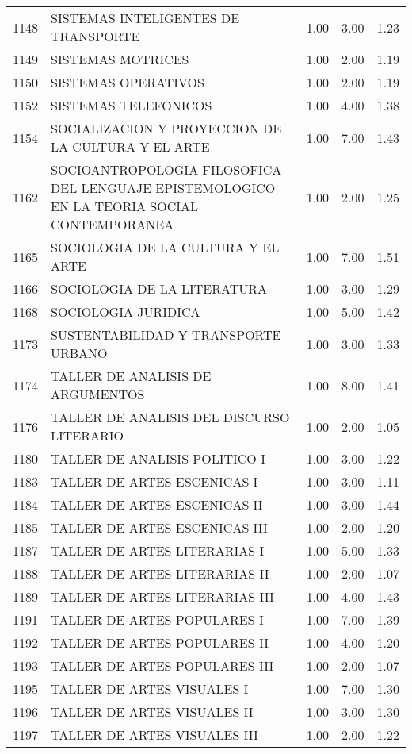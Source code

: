 \documentclass[12pt]{article}
\begin{document}
\begin{table}[ht]
\begin{tabular}{rlrrr}
  1148 & SISTEMAS INTELIGENTES DE TRANSPORTE & 1.00 & 3.00 & 1.23 \\ 
  1149 & SISTEMAS MOTRICES & 1.00 & 2.00 & 1.19 \\ 
  1150 & SISTEMAS OPERATIVOS & 1.00 & 2.00 & 1.19 \\ 
  1152 & SISTEMAS TELEFONICOS & 1.00 & 4.00 & 1.38 \\ 
  1154 & SOCIALIZACION Y PROYECCION DE LA CULTURA Y EL ARTE & 1.00 & 7.00 & 1.43 \\ 
  1162 & SOCIOANTROPOLOGIA FILOSOFICA DEL LENGUAJE EPISTEMOLOGICO EN LA TEORIA SOCIAL CONTEMPORANEA & 1.00 & 2.00 & 1.25 \\ 
  1165 & SOCIOLOGIA DE LA CULTURA Y EL ARTE & 1.00 & 7.00 & 1.51 \\ 
  1166 & SOCIOLOGIA DE LA LITERATURA & 1.00 & 3.00 & 1.29 \\ 
  1168 & SOCIOLOGIA JURIDICA & 1.00 & 5.00 & 1.42 \\ 
  1173 & SUSTENTABILIDAD Y TRANSPORTE URBANO & 1.00 & 3.00 & 1.33 \\ 
  1174 & TALLER DE ANALISIS DE ARGUMENTOS & 1.00 & 8.00 & 1.41 \\ 
  1176 & TALLER DE ANALISIS DEL DISCURSO LITERARIO & 1.00 & 2.00 & 1.05 \\ 
  1180 & TALLER DE ANALISIS POLITICO I & 1.00 & 3.00 & 1.22 \\ 
  1183 & TALLER DE ARTES ESCENICAS I & 1.00 & 3.00 & 1.11 \\ 
  1184 & TALLER DE ARTES ESCENICAS II & 1.00 & 3.00 & 1.44 \\ 
  1185 & TALLER DE ARTES ESCENICAS III & 1.00 & 2.00 & 1.20 \\ 
  1187 & TALLER DE ARTES LITERARIAS I & 1.00 & 5.00 & 1.33 \\ 
  1188 & TALLER DE ARTES LITERARIAS II & 1.00 & 2.00 & 1.07 \\ 
  1189 & TALLER DE ARTES LITERARIAS III & 1.00 & 4.00 & 1.43 \\ 
  1191 & TALLER DE ARTES POPULARES I & 1.00 & 7.00 & 1.39 \\ 
  1192 & TALLER DE ARTES POPULARES II & 1.00 & 4.00 & 1.20 \\ 
  1193 & TALLER DE ARTES POPULARES III & 1.00 & 2.00 & 1.07 \\ 
  1195 & TALLER DE ARTES VISUALES I & 1.00 & 7.00 & 1.30 \\ 
  1196 & TALLER DE ARTES VISUALES II & 1.00 & 3.00 & 1.30 \\ 
  1197 & TALLER DE ARTES VISUALES III & 1.00 & 2.00 & 1.22 \\ 

\end{tabular}
\end{table}
\end{document}
